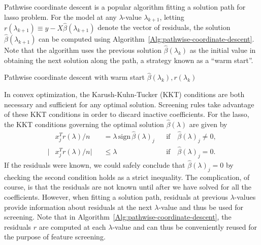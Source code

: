 \documentclass{article}
\providecommand{\sign}{\textrm{sign}}
\begin{document}
Pathwise coordinate descent is a popular algorithm fitting a solution path for lasso problem. For the model at any $\lambda$-value $\lambda_{k+1}$, letting $r(\lambda_{k+1}) \equiv y-X\hat{\beta}(\lambda_{k+1})$ denote the vector of residuals, the solution $\hat{\beta}(\lambda_{k+1})$ can be computed using Algorithm~\ref{Alg:pathwise-coordinate-descent}.  Note that the algorithm uses the previous solution $\hat{\beta}(\lambda_k)$ as the initial value in obtaining the next solution along the path, a strategy known as a ``warm start''.

\begin{algorithm}[H]\label{Alg:pathwise-coordinate-descent}
    \SetAlgoLined
    \BlankLine
    \caption{Pathwise coordinate descent with warm start $\hat{\beta}(\lambda_k),r(\lambda_k)$}
\end{algorithm}

In convex optimization, the Karush-Kuhn-Tucker (KKT) conditions are both necessary and sufficient for any optimal solution.  Screening rules take advantage of these KKT conditions in order to discard inactive coefficients.  For the lasso, the KKT conditions governing the optimal solution $\hat{\beta}(\lambda)$ are given by
\begin{equation}
  \begin{aligned}
    &x_j^Tr(\lambda)/n& &= \lambda \, \sign \, \hat{\beta}(\lambda)_j & & \textrm{if} \quad \hat{\beta}(\lambda)_j\neq 0,\\
    |&x_j^Tr(\lambda)/n|& &\leq \lambda & & \textrm{if} \quad \hat{\beta}(\lambda)_j= 0.
  \end{aligned}
\end{equation}
If the residuals were known, we could safely conclude that $\hat{\beta}(\lambda)_j=0$ by checking the second condition holds as a strict inequality.  The complication, of course, is that the residuals are not known until after we have solved for all the coefficients.  However, when fitting a solution path, residuals at previous $\lambda$-values provide information about residuals at the next $\lambda$-value and thus be used for screening.  Note that in Algorithm~\ref{Alg:pathwise-coordinate-descent}, the residuals $r$ are computed at each $\lambda$-value and can thus be conveniently reused for the purpose of feature screening.
\end{document}
